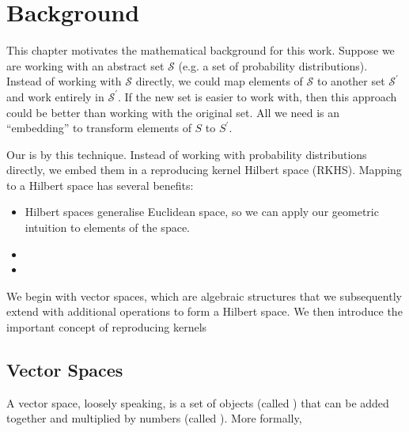\chapter{Background}
This chapter motivates the mathematical background for this work.  Suppose we are working with an abstract set $\mathcal{S}$ (e.g. a set of probability distributions). Instead of working with $\mathcal{S}$ directly, we could map elements of $\mathcal{S}$ to another set $\mathcal{S}^\prime$ and work entirely in $\mathcal{S}^\prime$. If the new set is easier to work with, then this approach could be better than working with the original set. All we need is an ``embedding'' to transform elements of $S$ to $S^\prime$.

Our  is  by this technique. Instead of working with probability distributions directly, we embed them in a reproducing kernel Hilbert space (RKHS). Mapping to a Hilbert space has several benefits:
%
\begin{itemize}
  \item Hilbert spaces generalise Euclidean space, so we can apply our geometric intuition to elements of the space.
  \item {}
  \item {}
\end{itemize}
%
We begin with vector spaces, which are algebraic structures that we subsequently extend with additional operations to form a Hilbert space. We then introduce the important concept of reproducing kernels

\section{Vector Spaces}
A vector space, loosely speaking, is a set of objects (called ) that can be added together and multiplied by numbers (called ). More formally,

